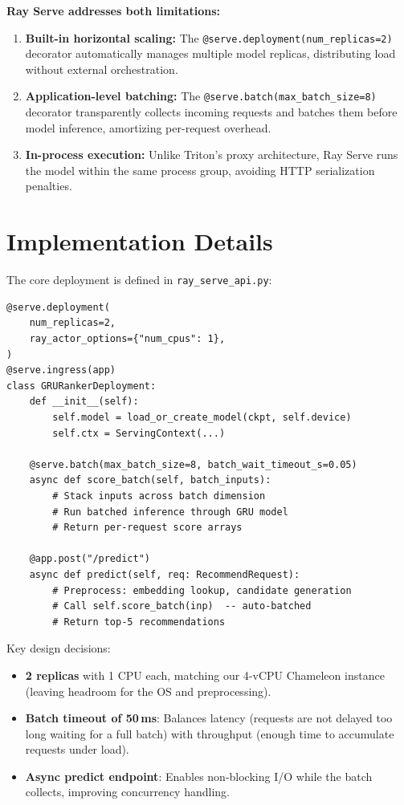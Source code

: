 \documentclass[11pt]{article}
\begin{document}
\noindent\textbf{Ray Serve addresses both limitations:}
\begin{enumerate}
  \item \textbf{Built-in horizontal scaling:} The \texttt{@serve.deployment(num\_replicas=2)} decorator automatically manages multiple model replicas, distributing load without external orchestration.
  \item \textbf{Application-level batching:} The \texttt{@serve.batch(max\_batch\_size=8)} decorator transparently collects incoming requests and batches them before model inference, amortizing per-request overhead.
  \item \textbf{In-process execution:} Unlike Triton's proxy architecture, Ray Serve runs the model within the same process group, avoiding HTTP serialization penalties.
\end{enumerate}

\section{Implementation Details}

The core deployment is defined in \texttt{ray\_serve\_api.py}:

\begin{lstlisting}
@serve.deployment(
    num_replicas=2,
    ray_actor_options={"num_cpus": 1},
)
@serve.ingress(app)
class GRURankerDeployment:
    def __init__(self):
        self.model = load_or_create_model(ckpt, self.device)
        self.ctx = ServingContext(...)

    @serve.batch(max_batch_size=8, batch_wait_timeout_s=0.05)
    async def score_batch(self, batch_inputs):
        # Stack inputs across batch dimension
        # Run batched inference through GRU model
        # Return per-request score arrays

    @app.post("/predict")
    async def predict(self, req: RecommendRequest):
        # Preprocess: embedding lookup, candidate generation
        # Call self.score_batch(inp)  -- auto-batched
        # Return top-5 recommendations
\end{lstlisting}

\noindent Key design decisions:
\begin{itemize}[nosep]
  \item \textbf{2 replicas} with 1 CPU each, matching our 4-vCPU Chameleon instance (leaving headroom for the OS and preprocessing).
  \item \textbf{Batch timeout of 50\,ms}: Balances latency (requests are not delayed too long waiting for a full batch) with throughput (enough time to accumulate requests under load).
  \item \textbf{Async predict endpoint}: Enables non-blocking I/O while the batch collects, improving concurrency handling.
\end{itemize}
\end{document}
